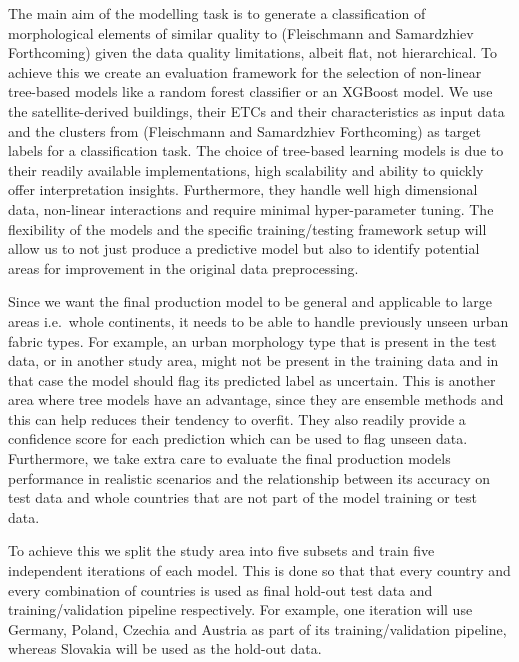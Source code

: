 \documentclass[
  letterpaper,
  DIV=11,
  numbers=noendperiod]{scrartcl}
\begin{document}
The main aim of the modelling task is to generate a classification of
morphological elements of similar quality to (Fleischmann and
Samardzhiev Forthcoming) given the data quality limitations, albeit
flat, not hierarchical. To achieve this we create an evaluation
framework for the selection of non-linear tree-based models like a
random forest classifier or an XGBoost model. We use the
satellite-derived buildings, their ETCs and their characteristics as
input data and the clusters from (Fleischmann and Samardzhiev
Forthcoming) as target labels for a classification task. The choice of
tree-based learning models is due to their readily available
implementations, high scalability and ability to quickly offer
interpretation insights. Furthermore, they handle well high dimensional
data, non-linear interactions and require minimal hyper-parameter
tuning. The flexibility of the models and the specific training/testing
framework setup will allow us to not just produce a predictive model but
also to identify potential areas for improvement in the original data
preprocessing.

Since we want the final production model to be general and applicable to
large areas i.e.~whole continents, it needs to be able to handle
previously unseen urban fabric types. For example, an urban morphology
type that is present in the test data, or in another study area, might
not be present in the training data and in that case the model should
flag its predicted label as uncertain. This is another area where tree
models have an advantage, since they are ensemble methods and this can
help reduces their tendency to overfit. They also readily provide a
confidence score for each prediction which can be used to flag unseen
data. Furthermore, we take extra care to evaluate the final production
models performance in realistic scenarios and the relationship between
its accuracy on test data and whole countries that are not part of the
model training or test data.

To achieve this we split the study area into five subsets and train five
independent iterations of each model. This is done so that that every
country and every combination of countries is used as final hold-out
test data and training/validation pipeline respectively. For example,
one iteration will use Germany, Poland, Czechia and Austria as part of
its training/validation pipeline, whereas Slovakia will be used as the
hold-out data.
\end{document}
